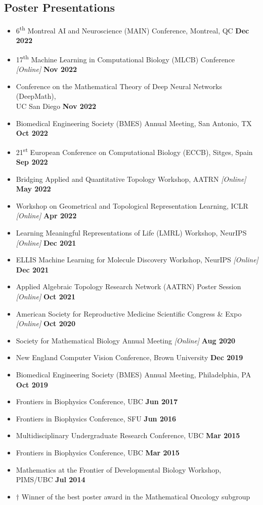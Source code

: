\documentclass[margin,line]{res}
\begin{document}
\begin{resume}
\section{\sc Poster Presentations}
{\renewcommand\leftmargini{0em}
\begin{itemize}
\setlength\itemsep{0.3em}
\item[] 6\textsuperscript{th} Montreal AI and Neuroscience (MAIN) Conference, Montreal, QC \hfill {\bf Dec 2022}
\item[] 17\textsuperscript{th} Machine Learning in Computational Biology (MLCB) Conference \textit{[Online]} \hfill {\bf Nov 2022}
\item[] Conference on the Mathematical Theory of Deep Neural Networks (DeepMath), \\ UC San Diego \hfill {\bf Nov 2022}
\item[] Biomedical Engineering Society (BMES) Annual Meeting, San Antonio, TX \hfill {\bf Oct 2022}
\item[] 21\textsuperscript{st} European Conference on Computational Biology (ECCB), Sitges, Spain \hfill {\bf Sep 2022}
\item[] Bridging Applied and Quantitative Topology Workshop, AATRN \textit{[Online]} \hfill {\bf May 2022}
\item[] Workshop on Geometrical and Topological Representation Learning, ICLR \textit{[Online]} \hfill {\bf Apr 2022} 
\item[] Learning Meaningful Representations of Life (LMRL) Workshop, NeurIPS \textit{[Online]} \hfill {\bf Dec 2021}
\item[] ELLIS Machine Learning for Molecule Discovery Workshop, NeurIPS \textit{[Online]} \hfill {\bf Dec 2021}
\item[] Applied Algebraic Topology Research Network (AATRN) Poster Session \textit{[Online]} \hfill {\bf Oct 2021}
\item[] American Society for Reproductive Medicine Scientific Congress \& Expo \textit{[Online]} \hfill {\bf Oct 2020}
\item[] Society for Mathematical Biology Annual Meeting\textsuperscript{\textdagger} \textit{[Online]} \hfill {\bf Aug 2020}
\item[] New England Computer Vision Conference, Brown University \hfill {\bf Dec 2019}
\item[] Biomedical Engineering Society (BMES) Annual Meeting, Philadelphia, PA \hfill {\bf Oct 2019}
\item[] Frontiers in Biophysics Conference, UBC \hfill {\bf Jun 2017}
\item[] Frontiers in Biophysics Conference, SFU \hfill {\bf Jun 2016}
\item[] Multidisciplinary Undergraduate Research Conference, UBC \hfill {\bf Mar 2015}
\item[] Frontiers in Biophysics Conference, UBC \hfill {\bf Mar 2015}
\item[] Mathematics at the Frontier of Developmental Biology Workshop, PIMS/UBC \hfill {\bf Jul 2014}
\item[] $\dagger$ Winner of the best poster award in the Mathematical Oncology subgroup


\end{itemize}}
\end{resume}
\end{document}
